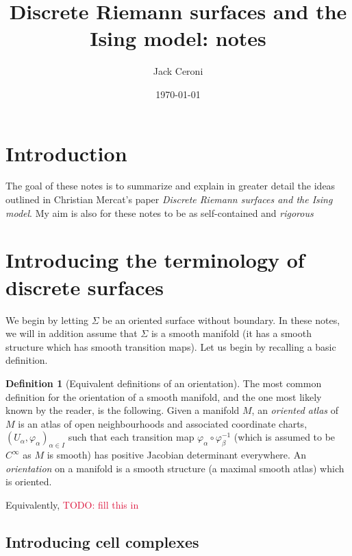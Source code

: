 \documentclass[aps,pra,showpacs,notitlepage,onecolumn,superscriptaddress,nofootinbib]{revtex4-1}
\newcommand{\pop}[1]{\textcolor{crimson}{#1}}
\theoremstyle{definition}
\newtheorem{definition}{Definition}[section]
\begin{document}
\title{Discrete Riemann surfaces and the Ising model: notes}
\author{Jack Ceroni}

\date{\today}

\maketitle

\section{Introduction}

\noindent The goal of these notes is to summarize and explain in greater detail the ideas outlined in Christian Mercat's paper \emph{Discrete Riemann surfaces and the Ising model}.
My aim is also for these notes to be as self-contained and \emph{rigorous}

\section{Introducing the terminology of discrete surfaces}

\noindent We begin by letting $\Sigma$ be an oriented surface without boundary. In these notes, we will in addition assume that $\Sigma$ is a smooth manifold (it has a smooth structure which
has smooth transition maps). Let us begin by recalling a basic definition.

\begin{definition}[Equivalent definitions of an orientation]
  The most common definition for the orientation of a smooth manifold, and the one most likely known by the reader, is the following.
  Given a manifold $M$, an \emph{oriented atlas} of $M$ is an atlas of open neighbourhoods and associated coordinate charts, $(U_{\alpha}, \varphi_{\alpha})_{\alpha \in I}$
  such that each transition map $\varphi_{\alpha} \circ \varphi_{\beta}^{-1}$ (which is assumed to be $C^{\infty}$ as $M$ is smooth) has positive Jacobian determinant everywhere.
  An \emph{orientation} on a manifold is a smooth structure (a maximal smooth atlas) which is oriented.

  Equivalently, \pop{TODO: fill this in}
\end{definition}

\subsection{Introducing cell complexes}
\end{document}
